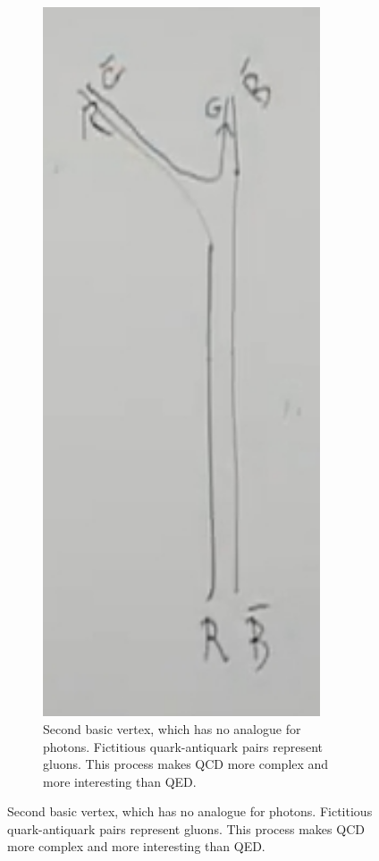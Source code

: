 \documentclass[]{article}
\begin{document}
\begin{figure}[H]
	\caption{The basic vertices of QCD--2 gluons}
		\begin{subfigure}[t]{0.40\textwidth}
		\caption{Second basic vertex, which has no analogue for photons. Fictitious quark-antiquark pairs represent gluons. This process makes QCD more complex and more interesting than QED.}\label{fig:2-2-gluon5}
		\includegraphics[width=0.9\textwidth]{2-2-gluon5}

\end{subfigure}
\end{figure}
\end{document}
